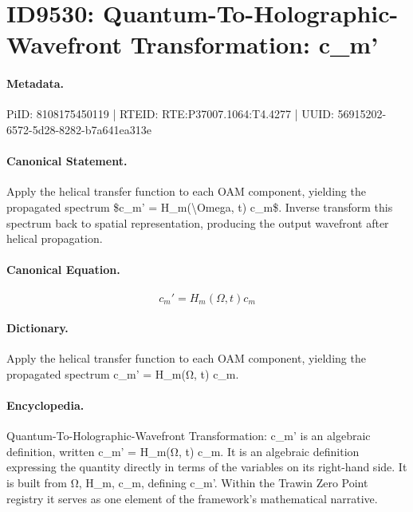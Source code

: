 \section*{ID9530: Quantum-To-Holographic-Wavefront Transformation: c\_m'}
\paragraph{Metadata.}
PiID: 8108175450119 | RTEID: RTE:P37007.1064:T4.4277 | UUID: 56915202-6572-5d28-8282-b7a641ea313e

\paragraph{Canonical Statement.}
Apply the helical transfer function to each OAM component, yielding the propagated spectrum \$c\_m' = H\_m(\textbackslash{}Omega, t) c\_m\$. Inverse transform this spectrum back to spatial representation, producing the output wavefront after helical propagation.

\paragraph{Canonical Equation.}
\[
c_m' = H_m(\Omega, t) c_m
\]

\paragraph{Dictionary.}
Apply the helical transfer function to each OAM component, yielding the propagated spectrum c\_m' = H\_m(Ω, t) c\_m.

\paragraph{Encyclopedia.}
Quantum-To-Holographic-Wavefront Transformation: c\_m' is an algebraic definition, written c\_m' = H\_m(Ω, t) c\_m. It is an algebraic definition expressing the quantity directly in terms of the variables on its right-hand side. It is built from Ω, H\_m, c\_m, defining c\_m'. Within the Trawin Zero Point registry it serves as one element of the framework's mathematical narrative.
